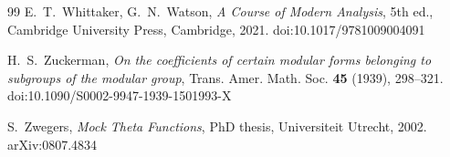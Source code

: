 \documentclass[11pt]{amsart}
\theoremstyle{definition}
\begin{document}
\begin{thebibliography}{99}
 E.~T.~Whittaker, G.~N.~Watson, \emph{A Course of Modern Analysis}, 5th ed., Cambridge University Press, Cambridge, 2021. doi:10.1017/9781009004091

 H.~S.~Zuckerman, \emph{On the coefficients of certain modular forms belonging to subgroups of the modular group}, Trans. Amer. Math. Soc. \textbf{45} (1939), 298--321. doi:10.1090/S0002-9947-1939-1501993-X

 S.~Zwegers, \emph{Mock Theta Functions}, PhD thesis, Universiteit Utrecht, 2002. arXiv:0807.4834

\end{thebibliography}
\end{document}
